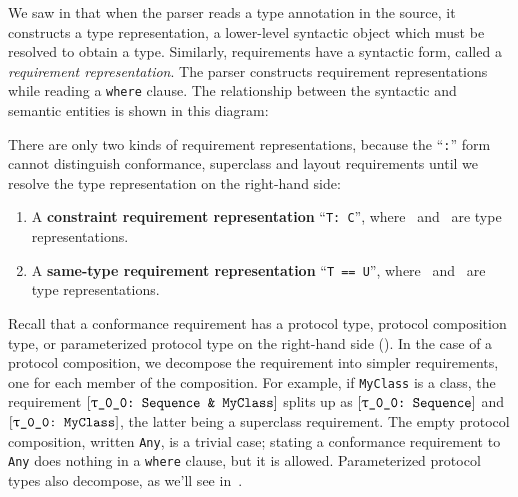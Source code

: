 \documentclass[../generics]{subfiles}
\begin{document}
We saw in  that when the parser reads a type annotation in the source, it constructs a type representation, a lower-level syntactic object which must be resolved to obtain a type. Similarly, requirements have a syntactic form, called a \emph{requirement representation}. The parser constructs requirement representations while reading a \texttt{where} clause. The relationship between the syntactic and semantic entities is shown in this diagram:
\begin{center}
\end{center}
There are only two kinds of requirement representations, because the ``\texttt{:}'' form cannot distinguish conformance, superclass and layout requirements until we resolve the type representation on the right-hand side:
\begin{enumerate}
\item A \textbf{constraint requirement representation} ``\texttt{T:\ C}'', where \tT\ and \tC\ are type representations.
\item A \textbf{same-type requirement representation} ``\texttt{T == U}'', where \tT\ and \tU\ are type representations.
\end{enumerate}

Recall that a conformance requirement has a protocol type, protocol composition type, or parameterized protocol type on the right-hand side (). In the case of a protocol composition, we decompose the requirement into simpler requirements, one for each member of the composition. For example, if \texttt{MyClass} is a class, the requirement $\ConfReq{\rT}{Sequence~\&~MyClass}$ splits up as $\ConfReq{\rT}{Sequence}$ and $\ConfReq{\rT}{MyClass}$, the latter being a superclass requirement. The empty protocol composition, written \texttt{Any}, is a trivial case; stating a conformance requirement to \texttt{Any} does nothing in a \texttt{where} clause, but it is allowed. Parameterized protocol types also decompose, as we'll see in~.
\end{document}
